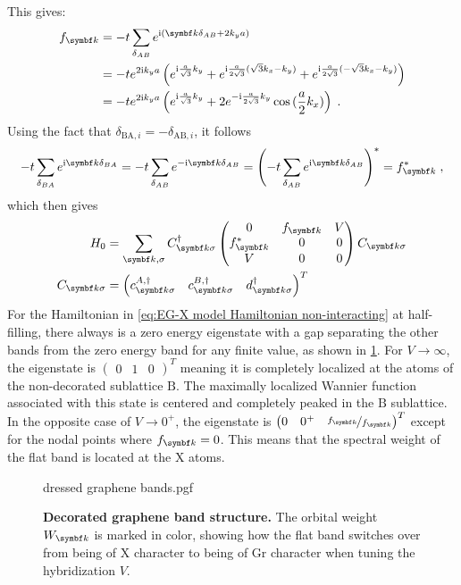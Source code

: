 \documentclass[../main.tex]{subfiles}
\begin{document}
This gives:
\begin{align}
	f_{\vb{k}} &= -t \sum_{\delta_{AB}} e^{\iu (\vb{k} \delta_{AB} + 2 k_y a)} \\
	&= -t e^{2 \iu k_y a} \left(
	e^{\iu \frac{a}{\sqrt{3}} k_y} +
	e^{\iu \frac{a}{2\sqrt{3}} (\sqrt{3} k_x - k_y)} +
	e^{\iu \frac{a}{2\sqrt{3}} (-\sqrt{3} k_x - k_y)} \right) \\
	&= -t e^{2 \iu k_y a} \left(
	e^{\iu \frac{a}{\sqrt{3}} k_y} +
	2 e^{-\iu \frac{a}{2\sqrt{3}} k_y}
	\cos{(\frac{a}{2} k_x)} \right) \;.
\end{align}
Using the fact that \(\delta_{\mathrm{BA}, i} = -\delta_{\mathrm{AB}, i}\), it follows
\begin{align}
	-t \sum_{\delta_{BA}} e^{\iu \vb{k} \delta_{BA}} = -t \sum_{\delta_{AB}} e^{-\iu \vb{k} \delta_{AB}} = \left(-t \sum_{\delta_{AB}} e^{\iu \vb{k} \delta_{AB}}\right)^* = f_{\vb{k}}^* \;,
\end{align}
which then gives
\begin{align}
	H_0 &= \sum_{\vb{k}, \sigma} C_{\vb{k} \sigma}^{\dagger}
	\begin{pmatrix}
		0 & f_{\vb{k}} & V \\
		f_{\vb{k}}^* & 0 & 0 \\
		V & 0 & 0
	\end{pmatrix} C_{\vb{k} \sigma}
	\label{eq:decorated graphene Hamiltonian non-interacting matrix} \\
	C_{\vb{k} \sigma} &= \begin{pmatrix} c_{\vb{k} \sigma}^{A, \dagger} & c_{\vb{k} \sigma}^{B, \dagger} & d_{\vb{k} \sigma}^{\dagger} \end{pmatrix}^T
\end{align}
For the Hamiltonian in \cref{eq:EG-X model Hamiltonian non-interacting} at half-filling, there always is a zero energy eigenstate with a gap separating the other bands from the zero energy band for any finite value, as shown in \cref{fig:decorated graphene model non-interacting bands}.
For \(V \to \infty\), the eigenstate is \(\begin{pmatrix} 0 & 1 & 0 \end{pmatrix}^T\) meaning it is completely localized at the atoms of the non-decorated sublattice \(\mathrm{B}\).
The maximally localized Wannier function associated with this state is centered and completely peaked in the \(\mathrm{B}\) sublattice.
In the opposite case of \(V \to 0^+\), the eigenstate is \(\begin{pmatrix} 0 & 0^+ & \nicefrac{f_{\vb{k}}}{f_{\vb{k}}} \end{pmatrix}^T\) except for the nodal points where \(f_{\vb{k}} = 0\).
This means that the spectral weight of the flat band is located at the \(\mathrm{X}\) atoms.
\begin{figure}[t]
	\centering
	{dressed graphene bands.pgf}
	\caption[Decorated graphene band structure.]{\textbf{Decorated graphene band structure.} The orbital weight \(W_{\vb{k}}\) is marked in color, showing how the flat band switches over from being of \(\mathrm{X}\) character to being of \(\mathrm{Gr}\) character when tuning the hybridization \(V\).}
	\label{fig:decorated graphene model non-interacting bands}
\end{figure}
\end{document}
